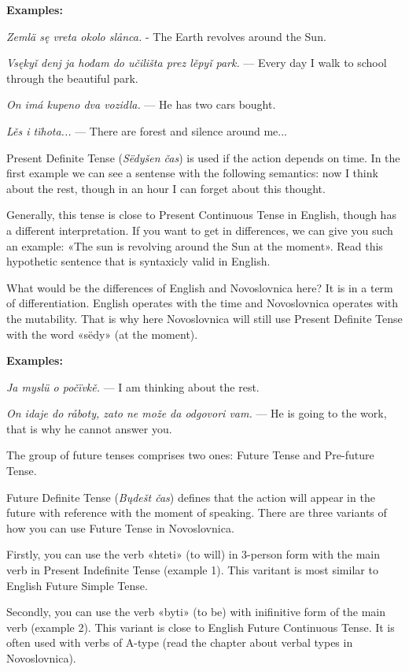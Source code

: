 \textbf{Examples:}

\textit{Zemlä sę vreta okolo slånca.} - The Earth revolves around the Sun.

\textit{Vsękyǐ denj ja hođam do učilišta prez lěpyǐ park.} — Every day I walk to school through the beautiful park.

\textit{On imá kupeno dva vozidla.} — He has two cars bought.

\textit{Lěs i tïhota...} — There are forest and silence around me...

Present Definite Tense (\textit{Sëdyšen čas}) is used if the action depends on time. In the first example we can see a sentense with the following semantics: now I think about the rest, though in an hour I can forget about this thought.

Generally, this tense is close to Present Continuous Tense in English, though has a different interpretation. If you want to get in differences, we can give you such an example: «The sun is revolving around the Sun at the moment». Read this hypothetic sentence that is syntaxicly valid in English.

What would be the differences of English and Novoslovnica here? It is in a term of differentiation. English operates with the time and Novoslovnica operates with the mutability. That is why here Novoslovnica will still use Present Definite Tense with the word «sëdy» (at the moment).

\textbf{Examples:}

\textit{Ja myslü o počïvkě.} — I am thinking about the rest.

\textit{On idaje do råboty, zato ne može da odgovori vam.} — He is going to the work, that is why he cannot answer you.

The group of future tenses comprises two ones: Future Tense and Pre-future Tense.

Future Definite Tense (\textit{Bųdešt čas}) defines that the action will appear in the future with reference with the moment of speaking. There are three variants of how you can use Future Tense in Novoslovnica.

Firstly, you can use the verb «hteti» (to will) in 3-person form with the main verb in Present Indefinite Tense (example 1). This varitant is most similar to English Future Simple Tense.

Secondly, you can use the verb «byti» (to be) with inifinitive form of the main verb (example 2). This variant is close to English Future Continuous Tense. It is often used with verbs of A-type (read the chapter about verbal types in Novoslovnica).

